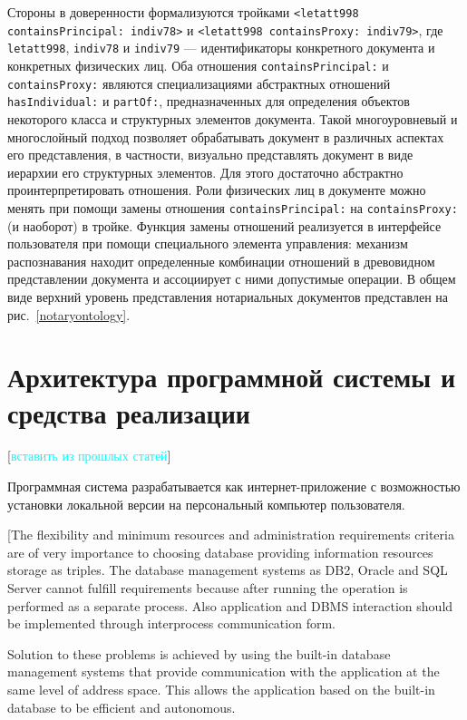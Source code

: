 \documentclass[utf8]{../IncArticle}
\newcommand{\e}[2][fcolor]{\textcolor{pcolor}{[}\textcolor{#1}{#2}\textcolor{pcolor}{]}}
\begin{document}
Стороны в доверенности формализуются тройками \texttt{<letatt998
  containsPrincipal: indiv78>} и \texttt{<letatt998 containsProxy:
  indiv79>}, где \texttt{letatt998}, \texttt{indiv78} и \texttt{indiv79} --- идентификаторы
конкретного документа и конкретных физических лиц.  Оба отношения
\texttt{containsPrincipal:} и  \texttt{containsProxy:} являются
специализациями абстрактных отношений \texttt{hasIndividual:} и
\texttt{partOf:}, предназначенных для определения объектов
некоторого класса и структурных элементов документа.  Такой
многоуровневый и многослойный подход позволяет обрабатывать документ в
различных аспектах его представления, в частности, визуально
представлять документ в виде иерархии его структурных элементов.  Для
этого достаточно абстрактно проинтерпретировать отношения.  Роли
физических лиц в документе можно менять при помощи замены
отношения \texttt{containsPrincipal:} на \texttt{containsProxy:} (и
наоборот) в тройке.  Функция замены отношений реализуется в интерфейсе
пользователя при помощи специального элемента управления: механизм
распознавания находит определенные комбинации отношений в древовидном
представлении документа и ассоциирует с ними допустимые операции.  В
общем виде верхний уровень представления нотариальных документов
представлен на рис.~\ref{notaryontology}.

\section{Архитектура программной системы и средства реализации}

\e[cyan]{вставить из прошлых статей}



Программная система разрабатывается как интернет-приложение с
возможностью установки локальной версии на персональный компьютер
пользователя.

[The flexibility and minimum resources and administration requirements criteria are of very importance to choosing database providing information resources storage as triples.  The database management systems as DB2, Oracle and SQL Server cannot fulfill requirements because after running the operation is performed as a separate process.  Also application and DBMS interaction should be implemented through interprocess communication form.

Solution to these problems is achieved by using the built-in database management systems that provide communication with the application at the same level of address space.  This allows the application based on the built-in database to be efficient and autonomous.
\end{document}
